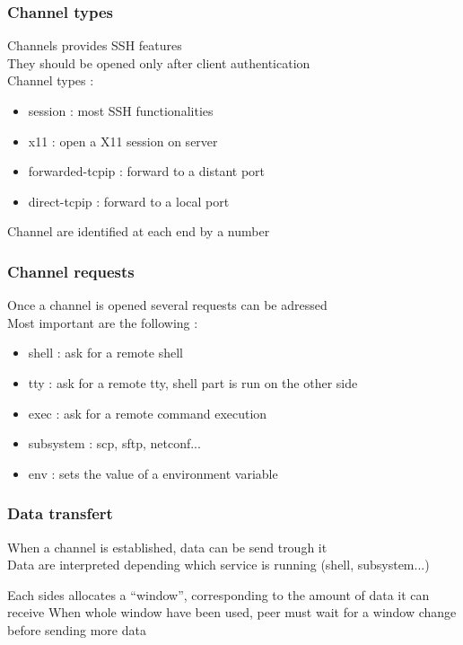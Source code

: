\documentclass{beamer}
\begin{document}
\begin{frame}
\frametitle{Channel types}
Channels provides SSH features\\
They should be opened only after client authentication\\

\vspace{8mm}
Channel types :
\begin{itemize}
\item session : most SSH functionalities
\item x11 : open a X11 session on server
\item forwarded-tcpip : forward to a distant port
\item direct-tcpip : forward to a local port
\end{itemize}

Channel are identified at each end by a number
\end{frame}



\begin{frame}
\frametitle{Channel requests}
Once a channel is opened several requests can be adressed\\
Most important are the following :
\begin{itemize}
\item shell : ask for a remote shell
\item tty : ask for a remote tty, shell part is run on the other side
\item exec : ask for a remote command execution
\item subsystem : scp, sftp, netconf...
\item env : sets the value of a environment variable
\end{itemize}

\end{frame}


\begin{frame}
\frametitle{Data transfert}
When a channel is established, data can be send trough it\\
Data are interpreted depending which service is running (shell, subsystem...)

\vspace{8mm}

Each sides allocates a ``window'', corresponding to the amount of data it can receive
When whole window have been used, peer must wait for a window change before sending more data

\end{frame}
\end{document}
